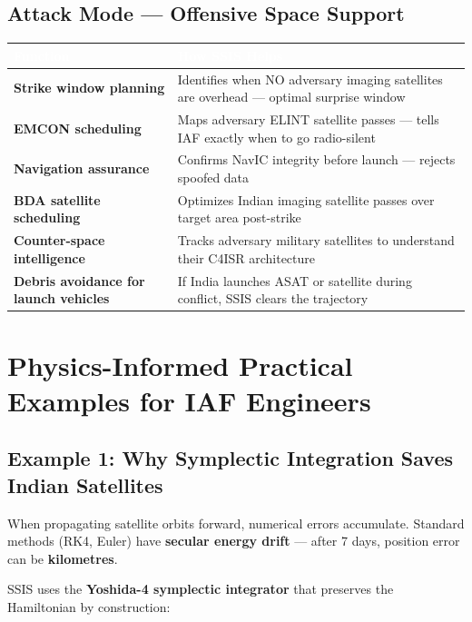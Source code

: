 \documentclass[11pt,a4paper]{article}
\newcommand{\TH}[1]{\textcolor{white}{\textbf{#1}}}
\begin{document}
\subsection{Attack Mode --- Offensive Space Support}
\begin{table}[H]\centering\small
\begin{tabularx}{\textwidth}{|p{4.5cm}|X|}
\hline
\rowcolor{dblue}\TH{Function} & \TH{How SSIS Helps} \\
\hline
\textbf{Strike window planning} & Identifies when NO adversary imaging satellites are overhead --- optimal surprise window \\
\hline
\textbf{EMCON scheduling} & Maps adversary ELINT satellite passes --- tells IAF exactly when to go radio-silent \\
\hline
\textbf{Navigation assurance} & Confirms NavIC integrity before launch --- rejects spoofed data \\
\hline
\textbf{BDA satellite scheduling} & Optimizes Indian imaging satellite passes over target area post-strike \\
\hline
\textbf{Counter-space intelligence} & Tracks adversary military satellites to understand their C4ISR architecture \\
\hline
\textbf{Debris avoidance for launch vehicles} & If India launches ASAT or satellite during conflict, SSIS clears the trajectory \\
\hline
\end{tabularx}
\end{table}

\newpage
\section{Physics-Informed Practical Examples for IAF Engineers}

\subsection{Example 1: Why Symplectic Integration Saves Indian Satellites}

When propagating satellite orbits forward, numerical errors accumulate. Standard methods (RK4, Euler) have \textbf{secular energy drift} --- after 7 days, position error can be \textbf{kilometres}.

SSIS uses the \textbf{Yoshida-4 symplectic integrator} that preserves the Hamiltonian by construction:
\end{document}
